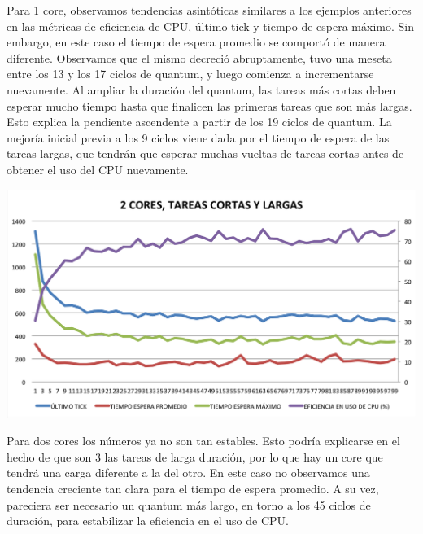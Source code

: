 Para 1 core, observamos tendencias asint\'oticas similares a los ejemplos anteriores en las m\'etricas de eficiencia de CPU, \'ultimo tick y tiempo de espera m\'aximo. Sin embargo, en este caso el tiempo de espera promedio se comport\'o de manera diferente. Observamos que el mismo decreci\'o abruptamente, tuvo una meseta entre los 13 y los 17 ciclos de quantum, y luego comienza a incrementarse nuevamente. Al ampliar la duraci\'on del quantum, las tareas m\'as cortas deben esperar mucho tiempo hasta que finalicen las primeras tareas que son m\'as largas. Esto explica la pendiente ascendente a partir de los 19 ciclos de quantum. La mejor\'ia inicial previa a los 9 ciclos viene dada por el tiempo de espera de las tareas largas, que tendr\'an que esperar muchas vueltas de tareas cortas antes de obtener el uso del CPU nuevamente. \\  

\begin{center}
	\includegraphics[scale=0.4]{graficos/2cores_loteCortasLargas.png} \\
\end{center}

Para dos cores los n\'umeros ya no son tan estables. Esto podr\'ia explicarse en el hecho de que son 3 las tareas de larga duraci\'on, por lo que hay un core que tendr\'a una carga diferente a la del otro. En este caso no observamos una tendencia creciente tan clara para el tiempo de espera promedio. A su vez, pareciera ser necesario un quantum m\'as largo, en torno a los 45 ciclos de duraci\'on, para estabilizar la eficiencia en el uso de CPU. \\


